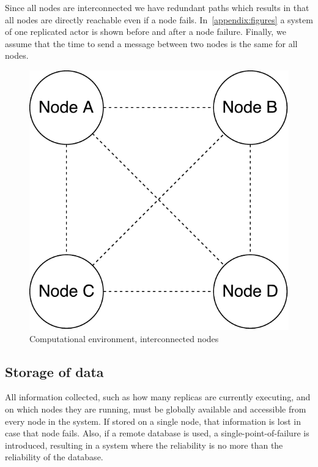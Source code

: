 \documentclass{cslthse-msc}
\begin{document}
Since all nodes are interconnected we have redundant paths which results in that all nodes are directly reachable even if a node fails. In~\cref{appendix:figures} a system of one replicated actor is shown before and after a node failure. Finally, we assume that the time to send a message between two nodes is the same for all nodes.

\begin{figure}[!hbt]
\centering
\includegraphics[scale=0.5]{images/computational_environment.pdf}
\caption{Computational environment, interconnected nodes} \label{fig:computational_environment}
\end{figure}

\subsection{Storage of data} \label{subsec:design_storage}
All information collected, such as how many replicas are currently executing, and on which nodes they are running, must be globally available and accessible from every node in the system. If stored on a single node, that information is lost in case that node fails. Also, if a remote database is used, a single-point-of-failure is introduced, resulting in a system where the reliability is no more than the reliability of the database. 
\end{document}
